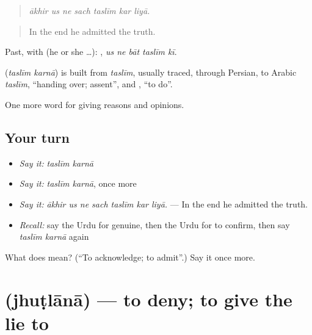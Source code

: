 \begin{quote}
      
\end{quote}

\begin{quote}
\emph{ākhir us ne sach taslīm kar liyā.}
\end{quote}

\begin{quote}
In the end he admitted the truth.
\end{quote}

Past, with  (he or she …):     , \emph{us ne bāt taslīm kī}.

\begin{cousinweb}
\textbf{ } (\emph{taslīm karnā}) is built from \emph{taslīm}, usually traced, through Persian, to Arabic \emph{taslīm}, \textquotedblleft{}handing over; assent\textquotedblright{}, and \textbf{}, \textquotedblleft{}to do\textquotedblright{}.
\end{cousinweb}

\begin{grammarlens}[title={What you've built}]
One more word for giving reasons and opinions.
\end{grammarlens}

\subsection*{Your turn}
\begin{itemize}
\raggedright
  \item \emph{Say it:} \emph{taslīm karnā}
  \item \emph{Say it:} \emph{taslīm karnā}, once more
  \item \emph{Say it:} \emph{ākhir us ne sach taslīm kar liyā.} — In the end he admitted the truth.
  \item \emph{Recall:} say the Urdu for genuine, then the Urdu for to confirm, then say \emph{taslīm karnā} again
\end{itemize}

\begin{tcolorbox}[breakable,colback=teal!4,colframe=teal!35!black,title={Before you move on}]
What does   mean? (\textquotedblleft{}To acknowledge; to admit\textquotedblright{}.) Say it once more.
\end{tcolorbox}
\section[\texorpdfstring{\ur{جھٹلانا} (jhuṭlānā)}{جھٹلانا (jhuṭlānā)}]{ (jhuṭlānā) — to deny; to give the lie to}

